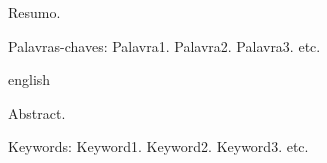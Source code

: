 \documentclass[
	12pt, oneside, a4paper, english, brazil
]{abntex2ppgsi}
\begin{document}
\frenchspacing 
\imprimircapa
\imprimirfolhaderosto*

\setlength{\absparsep}{18pt} %
\begin{resumo}

Resumo.

Palavras-chaves: Palavra1. Palavra2. Palavra3. etc.
\end{resumo}
\begin{resumo}[Abstract]
\begin{otherlanguage*}{english}

Abstract.

Keywords: Keyword1. Keyword2. Keyword3. etc.
\end{otherlanguage*}
\end{resumo}
\listoffigures*
\cleardoublepage
{}
\listofquadros*
\cleardoublepage
{}
\listoftables*
\cleardoublepage
\end{document}
